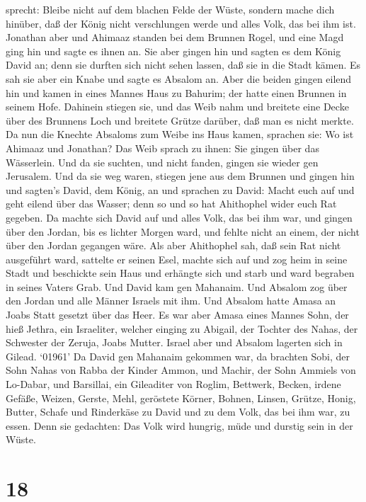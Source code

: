 sprecht: Bleibe nicht auf dem blachen Felde der Wüste, sondern mache
dich hinüber, daß der König nicht verschlungen werde und alles Volk, das
bei ihm ist.  Jonathan aber und Ahimaaz standen bei dem
Brunnen Rogel, und eine Magd ging hin und sagte es ihnen an. Sie aber
gingen hin und sagten es dem König David an; denn sie durften sich nicht
sehen lassen, daß sie in die Stadt kämen.  Es sah sie aber
ein Knabe und sagte es Absalom an. Aber die beiden gingen eilend hin und
kamen in eines Mannes Haus zu Bahurim; der hatte einen Brunnen in seinem
Hofe. Dahinein stiegen sie,  und das Weib nahm und breitete
eine Decke über des Brunnens Loch und breitete Grütze darüber, daß man
es nicht merkte.  Da nun die Knechte Absaloms zum Weibe ins
Haus kamen, sprachen sie: Wo ist Ahimaaz und Jonathan? Das Weib sprach
zu ihnen: Sie gingen über das Wässerlein. Und da sie suchten, und nicht
fanden, gingen sie wieder gen Jerusalem.  Und da sie weg
waren, stiegen jene aus dem Brunnen und gingen hin und sagten's David,
dem König, an und sprachen zu David: Macht euch auf und geht eilend über
das Wasser; denn so und so hat Ahithophel wider euch Rat gegeben.
 Da machte sich David auf und alles Volk, das bei ihm war,
und gingen über den Jordan, bis es lichter Morgen ward, und fehlte nicht
an einem, der nicht über den Jordan gegangen wäre.  Als
aber Ahithophel sah, daß sein Rat nicht ausgeführt ward, sattelte er
seinen Esel, machte sich auf und zog heim in seine Stadt und beschickte
sein Haus und erhängte sich und starb und ward begraben in seines Vaters
Grab.  Und David kam gen Mahanaim. Und Absalom zog über den
Jordan und alle Männer Israels mit ihm.  Und Absalom hatte
Amasa an Joabs Statt gesetzt über das Heer. Es war aber Amasa eines
Mannes Sohn, der hieß Jethra, ein Israeliter, welcher einging zu
Abigail, der Tochter des Nahas, der Schwester der Zeruja, Joabs Mutter.
 Israel aber und Absalom lagerten sich in Gilead.
 `01961' Da David gen Mahanaim gekommen war, da brachten
Sobi, der Sohn Nahas von Rabba der Kinder Ammon, und Machir, der Sohn
Ammiels von Lo-Dabar, und Barsillai, ein Gileaditer von Roglim,
 Bettwerk, Becken, irdene Gefäße, Weizen, Gerste, Mehl,
geröstete Körner, Bohnen, Linsen, Grütze,  Honig, Butter,
Schafe und Rinderkäse zu David und zu dem Volk, das bei ihm war, zu
essen. Denn sie gedachten: Das Volk wird hungrig, müde und durstig sein
in der Wüste.

\hypertarget{section-17}{%
\section{18}\label{section-17}}

